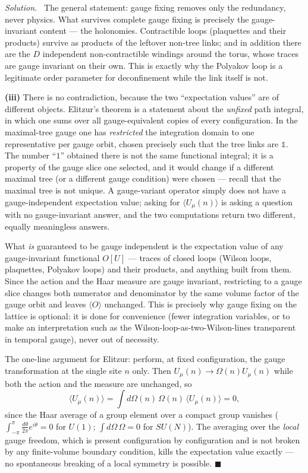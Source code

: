 \documentclass[11pt]{article}
\newenvironment{solution}{\par\smallskip\noindent\textit{Solution.}\ }{\hfill$\blacksquare$\par\smallskip}
\begin{document}
\begin{solution}
The general statement: gauge fixing removes only the redundancy, never physics. What survives complete gauge fixing is precisely the gauge-invariant content --- the holonomies. Contractible loops (plaquettes and their products) survive as products of the leftover non-tree links; and in addition there are the $D$ independent non-contractible windings around the torus, whose traces are gauge invariant on their own. This is exactly why the Polyakov loop is a legitimate order parameter for deconfinement while the link itself is not.

\textbf{(iii)} There is no contradiction, because the two ``expectation values'' are of different objects. Elitzur's theorem is a statement about the \emph{unfixed} path integral, in which one sums over all gauge-equivalent copies of every configuration. In the maximal-tree gauge one has \emph{restricted} the integration domain to one representative per gauge orbit, chosen precisely such that the tree links are $\mathbb{1}$. The number ``$1$'' obtained there is not the same functional integral; it is a property of the gauge slice one selected, and it would change if a different maximal tree (or a different gauge condition) were chosen --- recall that the maximal tree is not unique. A gauge-variant operator simply does not have a gauge-independent expectation value; asking for $\langle U_\mu(n)\rangle$ is asking a question with no gauge-invariant answer, and the two computations return two different, equally meaningless answers.

What \emph{is} guaranteed to be gauge independent is the expectation value of any gauge-invariant functional $O[U]$ --- traces of closed loops (Wilson loops, plaquettes, Polyakov loops) and their products, and anything built from them. Since the action and the Haar measure are gauge invariant, restricting to a gauge slice changes both numerator and denominator by the same volume factor of the gauge orbit and leaves $\langle O\rangle$ unchanged. This is precisely why gauge fixing on the lattice is optional: it is done for convenience (fewer integration variables, or to make an interpretation such as the Wilson-loop-as-two-Wilson-lines transparent in temporal gauge), never out of necessity.

The one-line argument for Elitzur: perform, at fixed configuration, the gauge transformation at the single site $n$ only. Then $U_\mu(n) \to \Omega(n)U_\mu(n)$ while both the action and the measure are unchanged, so
\begin{equation}
\langle U_\mu(n)\rangle = \int d\Omega(n)\,\Omega(n)\,\langle U_\mu(n)\rangle = 0,
\end{equation}
since the Haar average of a group element over a compact group vanishes ($\int_{-\pi}^{\pi} \frac{d\theta}{2\pi} e^{i\theta} = 0$ for $U(1)$; $\int d\Omega\,\Omega = 0$ for $SU(N)$). The averaging over the \emph{local} gauge freedom, which is present configuration by configuration and is not broken by any finite-volume boundary condition, kills the expectation value exactly --- no spontaneous breaking of a local symmetry is possible.
\end{solution}
\end{document}
